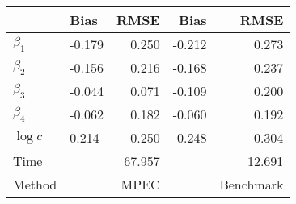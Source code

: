 
\begin{tabular}[t]{llrrr}
\toprule
  & Bias & RMSE & Bias & RMSE\\
\midrule
$\beta_{1}$ & -0.179 & 0.250 & -0.212 & 0.273\\
$\beta_{2}$ & -0.156 & 0.216 & -0.168 & 0.237\\
$\beta_{3}$ & -0.044 & 0.071 & -0.109 & 0.200\\
$\beta_{4}$ & -0.062 & 0.182 & -0.060 & 0.192\\
$\log c$ & 0.214 & 0.250 & 0.248 & 0.304\\
Time &  & 67.957 &  & 12.691\\
Method &  & MPEC &  & Benchmark\\
\bottomrule
\end{tabular}
